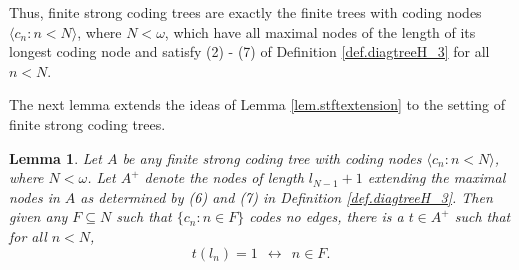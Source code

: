\documentclass{amsart}
\newtheorem{lem}[thm]{Lemma}
\theoremstyle{remark}
\theoremstyle{definition}
\theoremstyle{remark}
\newcommand{\om}{\omega}
\newcommand{\sse}{\subseteq}
\newcommand{\lgl}{\langle}
\newcommand{\rgl}{\rangle}
\begin{document}
Thus, finite strong coding trees  are exactly the finite trees  with coding nodes $\lgl c_n:n<N\rgl$, where $N<\om$, which have all  maximal nodes of the  length of its  longest coding node  and satisfy  (2) - (7) of Definition \ref{def.diagtreeH_3} for all  $n<N$.


The next lemma extends the ideas of
 Lemma \ref{lem.stftextension} to the setting of finite strong coding trees.


\begin{lem}\label{lem.finitesctA_3}
Let $A$ be any finite strong coding tree with coding nodes $\lgl c_n:n<N\rgl$, where $N<\om$.
Let $A^+$ denote the  nodes of length $l_{N-1}+1$ extending the maximal nodes in $A$ as determined by (6) and (7) in Definition \ref{def.diagtreeH_3}.
Then given any $F\sse N$ such that $\{c_n:n\in F\}$ codes no edges, there is a  $t\in A^+$ such that
for all $n<N$,
\begin{equation}\label{eq.finitesctA_3}
t(l_n)=1\ \ \longleftrightarrow\ \ n\in F.
\end{equation}
\end{lem}
\end{document}

